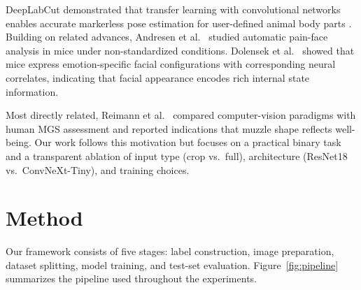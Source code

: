 \documentclass[sigconf]{acmart}
\begin{document}
DeepLabCut demonstrated that transfer learning with convolutional networks
enables accurate markerless pose estimation for user-defined animal body parts
\cite{Mathis2018}. Building on related advances, Andresen et al.~\cite{Andresen2026}
studied automatic pain-face analysis in mice under non-standardized
conditions. Dolensek et al.~\cite{Dolensek2020} showed that mice express
emotion-specific facial configurations with corresponding neural correlates,
indicating that facial appearance encodes rich internal state information.

Most directly related, Reimann et al.~\cite{Reimann2026} compared computer-vision
paradigms with human MGS assessment and reported indications that muzzle shape
reflects well-being. Our work follows this motivation but focuses on a
practical binary task and a transparent ablation of input type (crop vs.\ full),
architecture (ResNet18 vs.\ ConvNeXt-Tiny), and training choices.

\section{Method}
\label{sec:method}

Our framework consists of five stages: label construction, image preparation,
dataset splitting, model training, and test-set evaluation.
Figure~\ref{fig:pipeline} summarizes the pipeline used throughout the
experiments.
\end{document}
